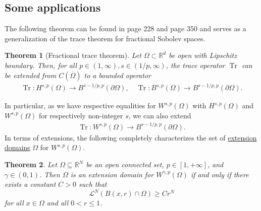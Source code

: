 \documentclass[
    a4paper,
    DIV=14,
    abstract=true,
    numbers=noenddot
]
{scrartcl}
\newtheorem{theorem}{Theorem}[section]
\theoremstyle{definition}
\newcommand{\R}{\mathbb{R}}
\begin{document}
\subsection{Some applications}
The following theorem can be found in \cite{agranovich2015sobolev} page 228 and \cite{leoni2023first} page 350 and serves as a generalization of the trace theorem for fractional Sobolev spaces.
\begin{theorem}[Fractional trace theorem]\label{trace theorem}
  Let $\Omega \subset \R^d$ be open with Lipschitz boundary. Then, for all  $p\in (1,\infty), s\in (1/p,\infty) $, the trace operator $\operatorname{Tr}$ can be extended from $C(\overline{\Omega } )$  to a bounded operator
  \begin{align*}
    \operatorname{Tr}: H^{s,p}(\Omega ) \to B^{s-1/p,p}(\partial\Omega), \quad \operatorname{Tr}: B^{s,p}(\Omega ) \to B^{s-1/p,p}(\partial\Omega).
  \end{align*}
\end{theorem}
In particular, as we have respective equalities for $W^{s,p}(\Omega )$ with $H^{s,p}(\Omega )$ and $W^{s,p}(\Omega )$ for respectively non-integer  $s$, we can also extend
\begin{align*}
  \operatorname{Tr}: W^{s,p}(\Omega ) \to B^{s-1/p,p}(\partial\Omega).
\end{align*}
In terms of extensions, the following completely characterizes the set of \href{}{extension domains} $\Omega $ for $W^{s,p}(\Omega )$.
\begin{theorem}
  Let $\Omega \subseteq \mathbb{R}^N$ be an open connected set, $p\in [1,+\infty]$, and $\gamma\in (0,1)$. Then $\Omega$ is an extension domain for $W^{\gamma, p}(\Omega)$ if and only if there exists a constant $C>0$ such that
  $$
    \mathcal{L}^N(B(x, r) \cap \Omega) \geq C r^N
  $$
  for all $x \in \Omega$ and all $0<r \leq 1$.
\end{theorem}
\end{document}
